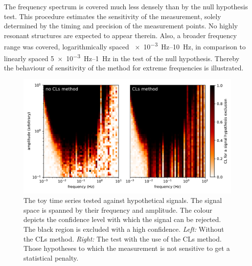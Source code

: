 The frequency spectrum is covered much less densely than by the null hypothesis test. This procedure estimates the sensitivity of the measurement, solely determined by the timing and precision of the measurement points. No highly resonant structures are expected to appear therein.
Also, a broader frequency range was covered, logarithmically spaced \SIrange[range-phrase=--]{e-3}{10}{\hertz}, in comparison to linearly spaced \SIrange[range-phrase=--]{5e-3}{1}{\hertz} in the test of the null hypothesis. Thereby the behaviour of sensitivity of the method for extreme frequencies is illustrated.



\begin{figure}
  \centering
  \includegraphics[width=\linewidth]{gfx/axions/basic_exclusion.pdf}
  \caption{The toy time series tested against hypothetical signals.
  The signal space is spanned by their frequency and amplitude.
  The colour depicts the confidence level with which the signal can be rejected.
  The black region is excluded with a high confidence.
  \emph{Left:} Without the CLs method. \emph{Right:} The test with the use of the CLs method. Those hypotheses to which the measurement is not sensitive to get a statistical penalty.}\label{fig:axions_exclusions}
\end{figure}


